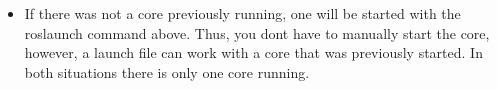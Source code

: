 \documentclass[12pt]{article}
\newcommand{\lfname}{file\textunderscore name}
\begin{document}
\begin{itemize}
	{\selectfont  \hspace{5mm} \$ roslaunch /path\textunderscore to\textunderscore file/\lfname.launch } \\


	\item If there was not a core previously running, one will be started with the roslaunch command above. Thus, you dont have to manually start the core, however, a launch file can work with a core that was previously started. In both situations there is only one core running. 

	\end{itemize}
\end{document}

